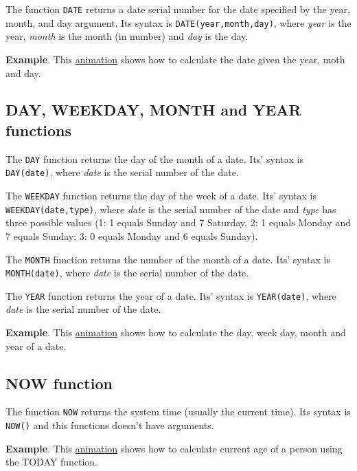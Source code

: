 The function \texttt{DATE} returns a date serial number for the date specified by the year, month, and day argument. Its syntax is \texttt{DATE(year,month,day)}, where \emph{year} is the year, \emph{month} is the month (in number) and \emph{day} is the day.

\textbf{Example}. This \href{http://aprendeconalf.es/office/excel/manual/img/example_function_date.gif}{animation} shows how to calculate the date given the year, moth and day.

\subsection{DAY, WEEKDAY, MONTH and YEAR functions}\hypertarget{day-weekday-month-and-year-functions}{}\label{day-weekday-month-and-year-functions}

The \texttt{DAY} function returns the day of the month of a date. Its' syntax is \texttt{DAY(date)}, where \emph{date} is the serial number of the date.

The \texttt{WEEKDAY} function returns the day of the week of a date. Its' syntax is \texttt{WEEKDAY(date,type)}, where \emph{date} is the serial number of the date and \emph{type} has three possible values (1: 1 equals Sunday and 7 Saturday, 2: 1 equals Monday and 7 equals Sunday; 3: 0 equals Monday and 6 equals Sunday).

The \texttt{MONTH} function returns the number of the month of a date. Its' syntax is \texttt{MONTH(date)}, where \emph{date} is the serial number of the date.

The \texttt{YEAR} function returns the year of a date. Its' syntax is \texttt{YEAR(date)}, where \emph{date} is the serial number of the date.

\textbf{Example}. This \href{http://aprendeconalf.es/office/excel/manual/img/example_function_day.gif}{animation} shows how to calculate the day, week day, month and year of a date.

\subsection{NOW function}\hypertarget{now-function}{}\label{now-function}

The function \texttt{NOW} returns the system time (usually the current time). Its syntax is \texttt{NOW()} and this functions doesn't have arguments.

\textbf{Example}. This \href{http://aprendeconalf.es/office/excel/manual/img/example_function_now.gif}{animation} shows how to calculate current age of a person using the TODAY function.

